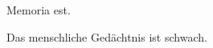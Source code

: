 \documentclass{scrbook}
\begin{document}
\meaning\textbardbl
\begin{pairs}

\begin{Leftside}
\beginnumbering
\pstart
Memoria   est.
\pend
\endnumbering
\end{Leftside}

\begin{Rightside}
\beginnumbering
\pstart
Das menschliche Gedächtnis ist schwach.
\pend
\endnumbering
\end{Rightside}

\Columns
\end{pairs}
\end{document}
